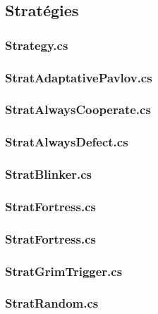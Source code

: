 \documentclass[a4paper, french]{article}
\begin{document}
\pagebreak
\subsection{Stratégies}
\subsubsection{Strategy.cs}


\subsubsection{StratAdaptativePavlov.cs}


\subsubsection{StratAlwaysCooperate.cs}


\subsubsection{StratAlwaysDefect.cs}


\subsubsection{StratBlinker.cs}


\subsubsection{StratFortress.cs}


\subsubsection{StratFortress.cs}


\subsubsection{StratGrimTrigger.cs}


\subsubsection{StratRandom.cs}

\end{document}

